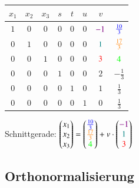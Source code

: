 \begin{minipage}[b]{0.55\columnwidth}
	\renewcommand{\arraystretch}{1.2}
	\begin{tabular}{| c c c c c c c | c |}
		\hline
		$x_1$ 	& $x_2$ & $x_3$	& $s$ 	& $t$ 	& $u$ 	& $v$ 						& 						\\
		\hline
		$1$ 	& $0$	& $0$	&	$0$ &	$0$	&	$0$	& ${\color{violet}-1}$ 				& ${\color{blue}\frac{10}{3}}$	\\
		$0$ 	& $1$	& $0$	&	$0$ &	$0$	&	$0$	& $\textcolor{teal}{1}$ 	& ${\color{orange}\frac{17}{3}}$	\\
		$0$ 	& $0$	& $1$	&	$0$ &	$0$	&	$0$	& ${\color{red}3}$ 				& ${\color{green}4}$				\\
		$0$ 	& $0$	& $0$	&	$1$ &	$0$	&	$0$	& $2$ 						& $-\frac{1}{3}$		\\
		$0$ 	& $0$	& $0$	&	$0$ &	$1$	&	$0$	& $1$ 						& $\frac{1}{3}$			\\
		$0$ 	& $0$	& $0$	&	$0$ &	$0$	&	$1$	& $0$ 						& $\frac{1}{3}$			\\
		\hline
	\end{tabular}	
	\renewcommand{\arraystretch}{1}	
\end{minipage}
\hfill
\begin{minipage}[b]{0.44\columnwidth}
	Schnittgerade: $\begin{pmatrix} x_1 \\ x_2 \\ x_3 \end{pmatrix} = 
					\begin{pmatrix} {\color{blue}\frac{10}{3}} \\ {\color{orange}\frac{17}{3}} \\ {\color{green}4} \end{pmatrix}
					+ v \cdot \begin{pmatrix} {\color{violet}-1} \\ \textcolor{teal}{1} \\ {\color{red}3} \end{pmatrix} $
\end{minipage}


\subsection{Orthonormalisierung}
		
